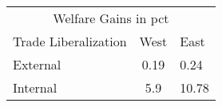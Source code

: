 \begin{tabular}{lcl}
\toprule 
\multicolumn{3}{c}{Welfare Gains in pct} \\
Trade Liberalization & West & East \\
\midrule 
External & 0.19 & 0.24 \\
\midrule 
Internal & 5.9 & 10.78 \\
\bottomrule 
\end{tabular}
